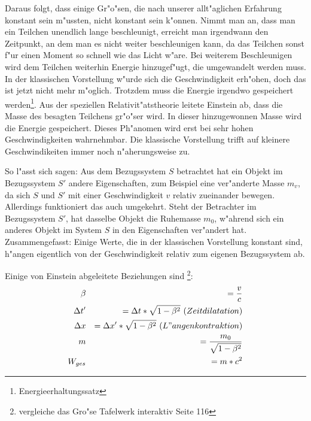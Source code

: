 \documentclass[14pt, a4paper]{report}
\begin{document}
Daraus folgt, dass einige Gr"o"sen, die nach unserer allt"aglichen Erfahrung konstant
sein m"ussten, nicht konstant sein k"onnen. Nimmt man an, dass man ein Teilchen 
unendlich lange beschleunigt, erreicht man irgendwann den Zeitpunkt, an dem man es nicht weiter
beschleunigen kann, da das Teilchen sonst f"ur einen Moment so schnell wie das Licht 
w"are. Bei weiterem Beschleunigen wird dem Teilchen weiterhin Energie hinzugef"ugt, die 
umgewandelt werden muss. In der klassischen Vorstellung 
w"urde sich die Geschwindigkeit erh"ohen, doch das ist jetzt nicht mehr m"oglich. 
Trotzdem muss die Energie irgendwo gespeichert werden\footnote{Energieerhaltungssatz}. 
Aus der speziellen Relativit"atstheorie leitete Einstein ab, dass die Masse des besagten
Teilchens gr"o"ser wird. In dieser hinzugewonnen Masse wird die Energie gespeichert.
Dieses Ph"anomen wird erst bei sehr hohen Geschwindigkeiten wahrnehmbar. Die klassische 
Vorstellung trifft auf kleinere Geschwindikeiten immer noch n"aherungsweise zu.

So l"asst sich sagen: Aus dem Bezugssystem $S$ betrachtet hat 
ein Objekt im Bezugssystem $S'$ andere Eigenschaften, zum Beispiel eine ver"anderte 
Masse $m_v$, da sich $S$ und $S'$ mit einer Geschwindigkeit $v$ relativ zueinander bewegen. 
Allerdings funktioniert das auch umgekehrt. Steht der Betrachter im Bezugssystem $S'$,
hat dasselbe Objekt die Ruhemasse $m_0$, w"ahrend sich ein anderes Objekt im System $S$ 
in den Eigenschaften ver"andert hat. Zusammengefasst: Einige Werte, die in der 
klassischen Vorstellung konstant sind, h"angen eigentlich von der Geschwindigkeit 
relativ zum eigenen Bezugssystem ab.

Einige von Einstein abgeleitete Beziehungen sind 
\footnote{vergleiche das Gro"se Tafelwerk interaktiv Seite 116 }:
\begin{eqnarray}
\beta && = \frac{v}{c} \\
\Delta t' && = \Delta t * \sqrt{1 - \beta^2} ~ (Zeitdilatation) \\
\Delta x && = \Delta x' * \sqrt{1 - \beta^2} ~ (L"angenkontraktion) \\
m && = \frac{m_0}{\sqrt{1 - \beta^2}} \label{var_m} \\
W_{ges} && = m * c^2 \label{mc_square}
\end{eqnarray}
\end{document}

